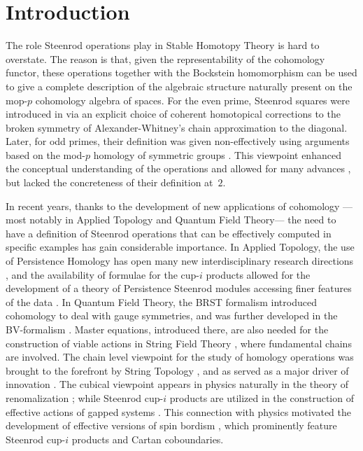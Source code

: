 
\section{Introduction}

The role Steenrod operations play in Stable Homotopy Theory is hard to overstate. The reason is that, given the representability of the cohomology functor, these operations together with the Bockstein homomorphism can be used to give a complete description of the algebraic structure naturally present on the mop-$p$ \mbox{cohomology} algebra of spaces. For the even prime, Steenrod squares were introduced in \cite{steenrod47products} via an explicit choice of coherent homotopical corrections to the broken symmetry of Alexander-Whitney's chain approximation to the diagonal. Later, for odd primes,	their definition was given non-effectively using arguments based on the mod-$p$ homology of symmetric groups \cites{steenrod53symmetric, steenrod53cyclic, steenrod62operations}. This viewpoint enhanced the conceptual understanding of the operations and allowed for many advances \cites{adem1952iteration, milnor1958dual, adams1995stable}, but lacked the concreteness of their definition at~$2$.

In recent years, thanks to the development of new applications of cohomology ---most notably in Applied Topology and Quantum Field Theory--- the need to have a definition of Steenrod operations that can be effectively computed in specific examples has gain considerable importance. In Applied Topology, the use of Persistence Homology \cites{carlsson2009data, edelsbrunner2008persistent} has open many new interdisciplinary research directions \cites{de2007coverage,chan2013topology,lee2017quantifying}, and the availability of formulae for the cup-$i$ products allowed for the development of a theory of Persistence Steenrod modules accessing finer features of the data \cite{medina2018persistence}. In Quantum Field Theory, the BRST formalism \cites{BRS,Tyutin,KugoOjima} introduced cohomology to deal with gauge symmetries, and was further developed in the BV-formalism \cite{BV}. Master equations, introduced there, are also needed for the construction of viable actions in String Field Theory \cite{Zwiebach}, where fundamental chains are involved. The chain level viewpoint for the study of homology operations was brought to the forefront by String Topology \cite{Sullivanoverview}, and as served as a major driver of innovation \cites{TZ, hoch2}. The cubical viewpoint appears in physics naturally in the theory of renomalization \cite{KreimerCubical}; while Steenrod cup-$i$ products are utilized in the construction of effective actions of gapped systems \cite{kapustin2017fermionic}. This connection with physics motivated the development of effective versions of spin bordism \cites{brumfiel2016pontrjagin, brumfiel2018pontrjagin}, which prominently feature Steenrod cup-$i$ products and Cartan coboundaries.

